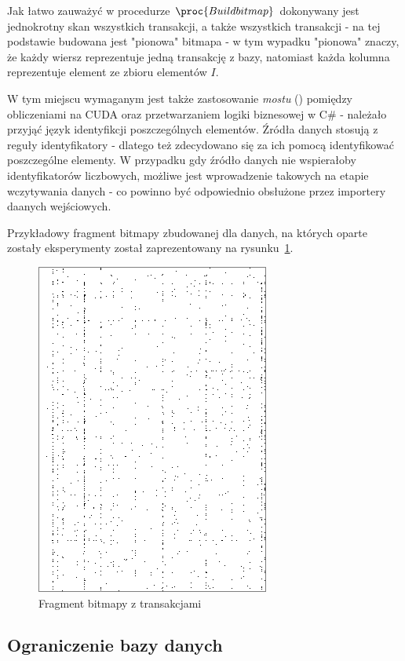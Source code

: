 Jak łatwo zauważyć w procedurze $\proc{Build bitmap}$ dokonywany jest jednokrotny skan wszystkich transakcji, a także wszystkich transakcji - na tej podstawie budowana jest "pionowa" bitmapa - w tym wypadku "pionowa" znaczy, że każdy wiersz reprezentuje jedną transakcję z bazy, natomiast każda kolumna reprezentuje element ze zbioru elementów $I$.

W tym miejscu wymaganym jest także zastosowanie \emph{mostu} () pomiędzy obliczeniami na CUDA oraz przetwarzaniem logiki biznesowej w C\# - należało przyjąć język identyfikcji poszczególnych elementów. Źródła danych stosują z reguły identyfikatory - dlatego też zdecydowano się za ich pomocą identyfikować poszczególne elementy. W przypadku gdy źródło danych nie wspierałoby identyfikatorów liczbowych, możliwe jest wprowadzenie takowych na etapie wczytywania danych - co powinno być odpowiednio obsłużone przez importery daanych wejściowych.

Przykładowy fragment bitmapy zbudowanej dla danych, na których oparte zostały eksperymenty został zaprezentowany na rysunku~\ref{rys:data_1}.

\begin{figure}[ht]
\centering
\includegraphics{figures/05/data_1.png}
\caption{Fragment bitmapy z transakcjami}\label{rys:data_1}
\end{figure}

\subsection{Ograniczenie bazy danych}\label{sec:ograniczenie}

